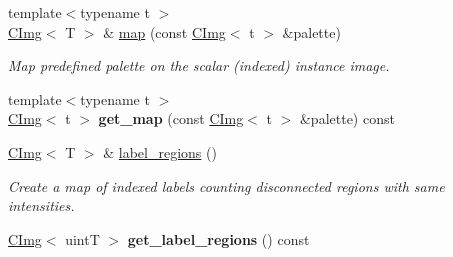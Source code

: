 \begin{DoxyCompactItemize}
\item 
{\footnotesize template$<$typename t $>$ }\\\hyperlink{structcimg__library_1_1CImg}{CImg}$<$ T $>$ \& \hyperlink{structcimg__library_1_1CImg_a1fe154cd43b8bf4b95fad6c8e2b853df}{map} (const \hyperlink{structcimg__library_1_1CImg}{CImg}$<$ t $>$ \&palette)
\begin{DoxyCompactList}\small\item\em Map predefined palette on the scalar (indexed) instance image. \item\end{DoxyCompactList}\item 
\hypertarget{structcimg__library_1_1CImg_a7c88dc499a2b6b938fd5432574bc435e}{
{\footnotesize template$<$typename t $>$ }\\\hyperlink{structcimg__library_1_1CImg}{CImg}$<$ t $>$ {\bfseries get\_\-map} (const \hyperlink{structcimg__library_1_1CImg}{CImg}$<$ t $>$ \&palette) const }
\label{structcimg__library_1_1CImg_a7c88dc499a2b6b938fd5432574bc435e}

\item 
\hyperlink{structcimg__library_1_1CImg}{CImg}$<$ T $>$ \& \hyperlink{structcimg__library_1_1CImg_acd78906a1eb7d7c0e1aa4c220e474540}{label\_\-regions} ()
\begin{DoxyCompactList}\small\item\em Create a map of indexed labels counting disconnected regions with same intensities. \item\end{DoxyCompactList}\item 
\hypertarget{structcimg__library_1_1CImg_aeaaa8b573a347790eeefa9bbb73c4373}{
\hyperlink{structcimg__library_1_1CImg}{CImg}$<$ uintT $>$ {\bfseries get\_\-label\_\-regions} () const }
\label{structcimg__library_1_1CImg_aeaaa8b573a347790eeefa9bbb73c4373}

\end{DoxyCompactItemize}
